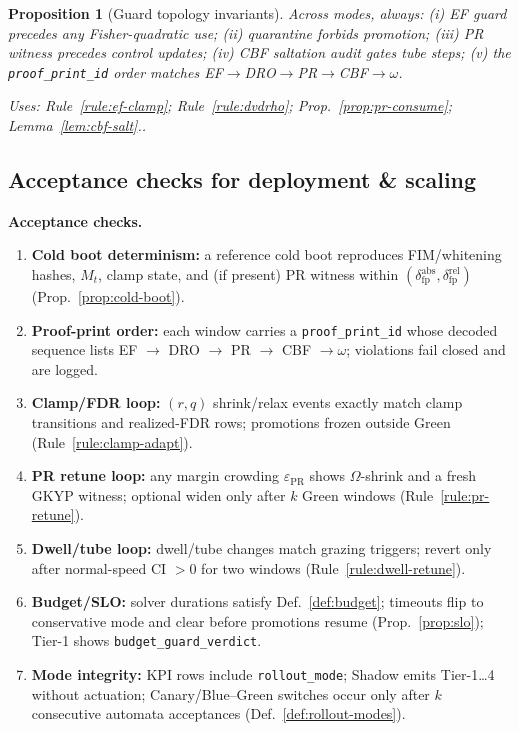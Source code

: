 \documentclass[10pt]{article}
\newcommand{\uses}[1]{\par\smallskip\noindent\textit{Uses: }#1.\par\smallskip}
\newcommand{\cutq}{q}
\newenvironment{acceptchecks}{\par\medskip\noindent\textbf{Acceptance checks.}\begin{enumerate}[leftmargin=*]}{\end{enumerate}\medskip}
\newenvironment{acceptchecks}{\begin{mdframed}\textbf{Acceptance checks.}\begin{enumerate}[leftmargin=*]}{\end{enumerate}\end{mdframed}}
\providecommand{\constsymPRmargin}{\varepsilon_{\mathrm{PR}}}
\newtheorem{proposition}{Proposition}
\begin{document}
\begin{proposition}[Guard topology invariants]\label{prop:guard-top}
Across modes, always: (i) EF guard precedes any Fisher-quadratic use; (ii) quarantine forbids promotion; (iii) PR witness precedes control updates; (iv) CBF saltation audit gates tube steps; (v) the \texttt{proof\_print\_id} order matches EF$\rightarrow$DRO$\rightarrow$PR$\rightarrow$CBF$\rightarrow\omega$.
\uses{Rule~\ref{rule:ef-clamp}; Rule~\ref{rule:dvdrho}; Prop.~\ref{prop:pr-consume}; Lemma~\ref{lem:cbf-salt}.}
\end{proposition}

\subsection{Acceptance checks for deployment \& scaling}\label{subsec:deploy-accept}
\begin{acceptchecks}
\item \textbf{Cold boot determinism:} a reference cold boot reproduces FIM/whitening hashes, $M_t$, clamp state, and (if present) PR witness within $(\delta_{\mathrm{fp}}^{\mathrm{abs}},\delta_{\mathrm{fp}}^{\mathrm{rel}})$ (Prop.~\ref{prop:cold-boot}).
\item \textbf{Proof-print order:} each window carries a \texttt{proof\_print\_id} whose decoded sequence lists EF $\rightarrow$ DRO $\rightarrow$ PR $\rightarrow$ CBF $\rightarrow \omega$; violations fail closed and are logged.
\item \textbf{Clamp/FDR loop:} $(r,\cutq)$ shrink/relax events exactly match clamp transitions and realized-FDR rows; promotions frozen outside Green (Rule~\ref{rule:clamp-adapt}).
\item \textbf{PR retune loop:} any margin crowding $\constsymPRmargin$ shows $\Omega$-shrink and a fresh GKYP witness; optional widen only after $k$ Green windows (Rule~\ref{rule:pr-retune}).
\item \textbf{Dwell/tube loop:} dwell/tube changes match grazing triggers; revert only after normal-speed CI $>0$ for two windows (Rule~\ref{rule:dwell-retune}).
\item \textbf{Budget/SLO:} solver durations satisfy Def.~\ref{def:budget}; timeouts flip to conservative mode and clear before promotions resume (Prop.~\ref{prop:slo}); Tier-1 shows \texttt{budget\_guard\_verdict}.
\item \textbf{Mode integrity:} KPI rows include \texttt{rollout\_mode}; Shadow emits Tier-1…4 without actuation; Canary/Blue–Green switches occur only after $k$ consecutive automata acceptances (Def.~\ref{def:rollout-modes}).
\end{acceptchecks}
\end{document}
